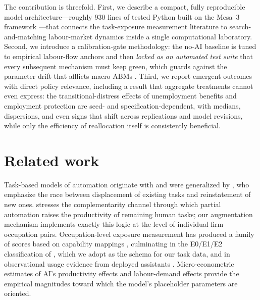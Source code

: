 \documentclass[11pt,a4paper]{article}
\begin{document}
The contribution is threefold. First, we describe a compact, fully reproducible model
architecture---roughly 930 lines of tested Python built on the Mesa~3 framework
\citep{kazil2020mesa, terhoeven2025mesa}---that connects the task-exposure measurement
literature \citep{eloundou2024gpts, felten2021occupational, webb2020impact,
handa2025economic} to search-and-matching labour-market dynamics
\citep{mortensen1994job, pissarides2000equilibrium} inside a single computational
laboratory. Second, we introduce a calibration-gate methodology: the no-AI baseline is
tuned to empirical labour-flow anchors and then \emph{locked as an automated test suite}
that every subsequent mechanism must keep green, which guards against the parameter
drift that afflicts macro ABMs \citep{fagiolo2017macro}. Third, we report emergent
outcomes with direct policy relevance, including a result that aggregate treatments
cannot even express: the transitional-distress effects of unemployment benefits and
employment protection are seed- and specification-dependent, with medians, dispersions,
and even signs that shift across replications and model revisions, while only the
efficiency of reallocation itself is consistently beneficial.

\section{Related work}

Task-based models of automation originate with \citet{autor2003skill} and were
generalized by \citet{acemoglu2018race, acemoglu2019automation}, who emphasize the race
between displacement of existing tasks and reinstatement of new ones.
\citet{autor2015why} stresses the complementarity channel through which partial
automation raises the productivity of remaining human tasks; our augmentation mechanism
implements exactly this logic at the level of individual firm--occupation pairs.
Occupation-level exposure measurement has produced a family of scores based on
capability mappings \citep{felten2021occupational, webb2020impact}, culminating in the
E0/E1/E2 classification of \citet{eloundou2024gpts}, which we adopt as the schema for
our task data, and in observational usage evidence from deployed assistants
\citep{handa2025economic}. Micro-econometric estimates of AI's productivity effects
\citep{noy2023experimental, brynjolfsson2025generative} and labour-demand effects
\citep{hampole2025ai} provide the empirical magnitudes toward which the model's
placeholder parameters are oriented.
\end{document}
